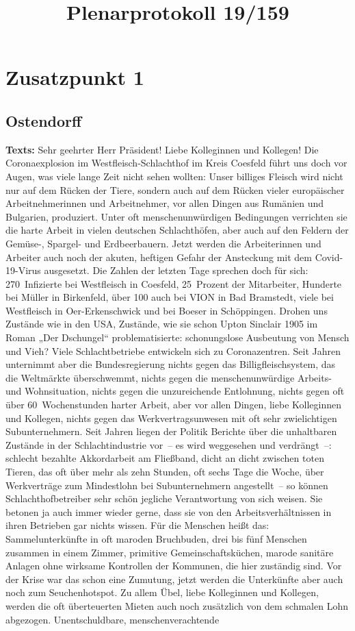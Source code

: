 \documentclass{article}
\begin{document}
\title{Plenarprotokoll 19/159
			}
\date{}
\maketitle
\tableofcontents
\newpage
\section{Zusatzpunkt 1}
\subsection{Ostendorff}
\noindent\textbf{Texts:} Sehr geehrter Herr Präsident! Liebe Kolleginnen und Kollegen! Die Coronaexplosion im Westfleisch-Schlachthof im Kreis Coesfeld führt uns doch vor Augen, was viele lange Zeit nicht sehen wollten: Unser billiges Fleisch wird nicht nur auf dem Rücken der Tiere, sondern auch auf dem Rücken vieler europäischer Arbeitnehmerinnen und Arbeitnehmer, vor allen Dingen aus Rumänien und Bulgarien, produziert. Unter oft menschenunwürdigen Bedingungen verrichten sie die harte Arbeit in vielen deutschen Schlachthöfen, aber auch auf den Feldern der Gemüse-, Spargel- und Erdbeerbauern. Jetzt werden die Arbeiterinnen und Arbeiter auch noch der akuten, heftigen Gefahr der Ansteckung mit dem Covid-19-Virus ausgesetzt. Die Zahlen der letzten Tage sprechen doch für sich: 270 Infizierte bei Westfleisch in Coesfeld, 25 Prozent der Mitarbeiter, Hunderte bei Müller in Birkenfeld, über 100 auch bei VION in Bad Bramstedt, viele bei Westfleisch in Oer-Erkenschwick und bei Boeser in Schöppingen. Drohen uns Zustände wie in den USA, Zustände, wie sie schon Upton Sinclair 1905 im Roman „Der Dschungel“ problematisierte: schonungslose Ausbeutung von Mensch und Vieh? Viele Schlachtbetriebe entwickeln sich zu Coronazentren. Seit Jahren unternimmt aber die Bundesregierung nichts gegen das Billigfleischsystem, das die Weltmärkte überschwemmt, nichts gegen die menschenunwürdige Arbeits- und Wohnsituation, nichts gegen die unzureichende Entlohnung, nichts gegen oft über 60 Wochenstunden harter Arbeit,  aber vor allen Dingen, liebe Kolleginnen und Kollegen, nichts gegen das Werkvertragsunwesen mit oft sehr zwielichtigen Subunternehmern. Seit Jahren liegen der Politik Berichte über die unhaltbaren Zustände in der Schlachtindustrie vor – es wird weggesehen und verdrängt –: schlecht bezahlte Akkordarbeit am Fließband, dicht an dicht zwischen toten Tieren, das oft über mehr als zehn Stunden, oft sechs Tage die Woche, über Werkverträge zum Mindestlohn bei Subunternehmern angestellt – so können Schlachthofbetreiber sehr schön jegliche Verantwortung von sich weisen. Sie betonen ja auch immer wieder gerne, dass sie von den Arbeitsverhältnissen in ihren Betrieben gar nichts wissen. Für die Menschen heißt das: Sammelunterkünfte in oft maroden Bruchbuden, drei bis fünf Menschen zusammen in einem Zimmer, primitive Gemeinschaftsküchen, marode sanitäre Anlagen ohne wirksame Kontrollen der Kommunen, die hier zuständig sind. Vor der Krise war das schon eine Zumutung, jetzt werden die Unterkünfte aber auch noch zum Seuchenhotspot.  Zu allem Übel, liebe Kolleginnen und Kollegen, werden die oft überteuerten Mieten auch noch zusätzlich von dem schmalen Lohn abgezogen. Unentschuldbare, menschenverachtende 
\end{document}
